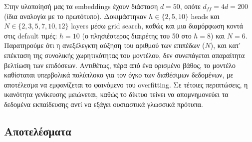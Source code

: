 \documentclass[12pt]{article}
\begin{document}
Στην υλοποίησή μας τα embeddings έχουν διάσταση $d = 50$, οπότε
$d_{ff} = 4d = 200$ (ίδια αναλογία με το πρωτότυπο). Δοκιμάστηκαν
$h \in \{2, 5, 10\}$ heads και $N \in \{2, 3, 5, 7, 10, 12\}$ layers μέσω grid search,
καθώς και μια διαμόρφωση κοντά στις default τιμές: $h = 10$ (ο πλησιέστερος
διαιρέτης του 50 στο $h=8$) και $N = 6$. Παρατηρούμε ότι η ανεξέλεγκτη αύξηση του αριθμού των επιπέδων ($N$), και κατ' επέκταση της συνολικής χωρητικότητας του μοντέλου, δεν συνεπάγεται απαραίτητα βελτίωση των επιδόσεων. Αντιθέτως, πέρα από ένα ορισμένο βάθος, το μοντέλο καθίσταται υπερβολικά πολύπλοκο για τον όγκο των διαθέσιμων δεδομένων, με αποτέλεσμα να εμφανίζεται το φαινόμενο του overfitting. Σε τέτοιες περιπτώσεις, η ικανότητα γενίκευσης μειώνεται, καθώς το δίκτυο τείνει να απομνημονεύει τα δεδομένα εκπαίδευσης αντί να εξάγει ουσιαστικά γλωσσικά πρότυπα.

\subsection{Αποτελέσματα}
\end{document}

